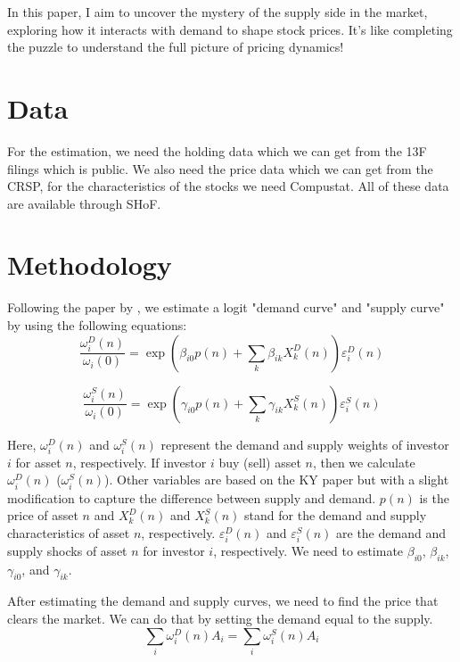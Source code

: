 \documentclass[a4paper]{article}
\begin{document}
In this paper, I aim to uncover the mystery of the supply side in the market, exploring how it interacts with demand to shape stock prices. It's like completing the puzzle to understand the full picture of pricing dynamics!



\section*{Data}
For the estimation, we need the holding data which we can get from the 13F filings which is public. We also need the price data which we can get from the CRSP, for the characteristics of the stocks we  need Compustat. All of these data are available through SHoF.


\section*{Methodology}
Following the paper by \cite{koijen2019demand}, we estimate a logit "demand curve" and "supply curve" by using the following equations:
\begin{equation}
	\dfrac{\omega_i^D(n)}{\omega_i(0)} = \exp\left(
		\beta_{i0} p(n) + \sum_k \beta_{ik} X_k^D(n)
	\right) \varepsilon_i^D(n)
\end {equation}

\begin{equation}
	\dfrac{\omega_i^S(n)}{\omega_i(0)} = \exp\left(
		\gamma_{i0} p(n) + \sum_k \gamma_{ik} X_k^S(n)
	\right) \varepsilon_i^S(n)
\end {equation}

Here, $\omega_i^D(n)$ and $\omega_i^S(n)$ represent the demand and supply weights of investor $i$ for asset $n$, respectively. If investor $i$ buy (sell) asset $n$, then we calculate $\omega_i^D(n)$ ($\omega_i^S(n)$). Other variables are based on the KY paper but with a slight modification to capture the difference between supply and demand. $p(n)$ is the price of asset $n$ and  $X_k^D(n)$ and $X_k^S(n)$ stand for the demand and supply characteristics of asset $n$, respectively. $\varepsilon_i^D(n)$ and $\varepsilon_i^S(n)$ are the demand and supply shocks of asset $n$ for investor $i$, respectively.
We need to estimate $\beta_{i0}$, $\beta_{ik}$, $\gamma_{i0}$, and $\gamma_{ik}$.

After estimating the demand and supply curves, we need to find the price that clears the market. We can do that by setting the demand equal to the supply.
\begin{equation}
	\sum_i \omega_i^D(n)A_i = \sum_i \omega_i^S(n)A_i
\end{equation}
\end{document}
